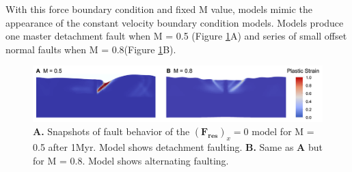 \documentclass[letterpaper,12pt,notitle]{memphisthesis}                     %
\begin{document}
With this force boundary condition and fixed M value, models mimic the appearance of the constant velocity boundary condition models. %
Models produce one master detachment fault when M = 0.5 (Figure \ref{fig:f0fault}A) and series of small offset normal faults when M = 0.8(Figure \ref{fig:f0fault}B).
%
\begin{figure}[!htb]
	\centering
	\includegraphics[width=0.99\linewidth]{./figs/f0fault.png}
	\caption{\textbf{A.} Snapshots of fault behavior of the $(\boldsymbol{F_{res}})_x=0$ model for M = 0.5 after 1Myr. Model shows detachment faulting. \textbf{B.} Same as \textbf{A} but for M = 0.8. Model shows alternating faulting.}
	\label{fig:f0fault}
\end{figure}
\end{document}
